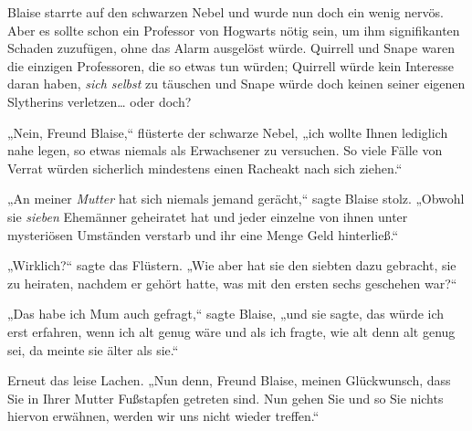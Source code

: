 Blaise starrte auf den schwarzen Nebel und wurde nun doch ein wenig nervös. Aber es sollte schon ein Professor von Hogwarts nötig sein, um ihm signifikanten Schaden zuzufügen, ohne das Alarm ausgelöst würde. Quirrell und Snape waren die einzigen Professoren, die so etwas tun würden; Quirrell würde kein Interesse daran haben, \emph{sich selbst} zu täuschen und Snape würde doch keinen seiner eigenen Slytherins verletzen… oder doch?

„Nein, Freund Blaise,“ flüsterte der schwarze Nebel, „ich wollte Ihnen lediglich nahe legen, so etwas niemals als Erwachsener zu versuchen. So viele Fälle von Verrat würden sicherlich mindestens einen Racheakt nach sich ziehen.“

„An meiner \emph{Mutter} hat sich niemals jemand gerächt,“ sagte Blaise stolz. „Obwohl sie \emph{sieben} Ehemänner geheiratet hat und jeder einzelne von ihnen unter mysteriösen Umständen verstarb und ihr eine Menge Geld hinterließ.“

„Wirklich?“ sagte das Flüstern. „Wie aber hat sie den siebten dazu gebracht, sie zu heiraten, nachdem er gehört hatte, was mit den ersten sechs geschehen war?“

„Das habe ich Mum auch gefragt,“ sagte Blaise, „und sie sagte, das würde ich erst erfahren, wenn ich alt genug wäre und als ich fragte, wie alt denn alt genug sei, da meinte sie älter als sie.“

Erneut das leise Lachen. „Nun denn, Freund Blaise, meinen Glückwunsch, dass Sie in Ihrer Mutter Fußstapfen getreten sind. Nun gehen Sie und so Sie nichts hiervon erwähnen, werden wir uns nicht wieder treffen.“

